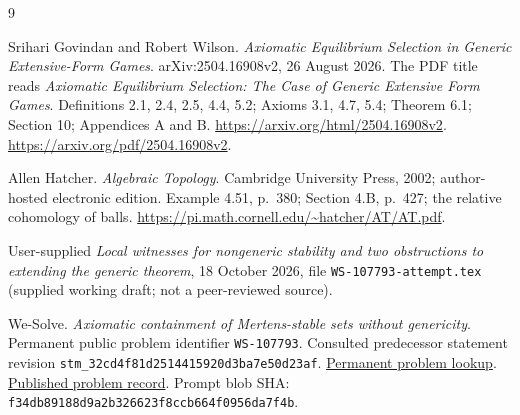 \documentclass[11pt]{article}
\theoremstyle{definition}
\begin{document}
\begin{thebibliography}{9}
\raggedright
{}
Srihari Govindan and Robert Wilson.
\emph{Axiomatic Equilibrium Selection in Generic Extensive-Form Games}.
arXiv:2504.16908v2, 26 August 2026.
The PDF title reads \emph{Axiomatic Equilibrium Selection: The Case of Generic
Extensive Form Games}.
Definitions 2.1, 2.4, 2.5, 4.4, 5.2; Axioms 3.1, 4.7, 5.4;
Theorem 6.1; Section 10; Appendices A and B.
\url{https://arxiv.org/html/2504.16908v2}.
\url{https://arxiv.org/pdf/2504.16908v2}.

Allen Hatcher.
\emph{Algebraic Topology}.
Cambridge University Press, 2002; author-hosted electronic edition.
Example 4.51, p.~380; Section 4.B, p.~427; the relative cohomology of balls.
\url{https://pi.math.cornell.edu/~hatcher/AT/AT.pdf}.

User-supplied \emph{Local witnesses for nongeneric stability and two
obstructions to extending the generic theorem}, 18 October 2026,
file \texttt{WS-107793-attempt.tex} (supplied working draft; not a
peer-reviewed source).

We-Solve.
\emph{Axiomatic containment of Mertens-stable sets without genericity}.
Permanent public problem identifier \texttt{WS-107793}.
Consulted predecessor statement revision
\texttt{stm\_32cd4f81d2514415920d3ba7e50d23af}.
\href{https://we-solve.github.io/api/v1/problems/WS-107793.json}{Permanent problem lookup}.
\href{https://we-solve.github.io/problems/axiomatic-containment-of-mertens-stable-sets-without-genericity/}{Published problem record}.
Prompt blob SHA: \texttt{f34db89188d9a2b326623f8ccb664f0956da7f4b}.
\end{thebibliography}
\end{document}

